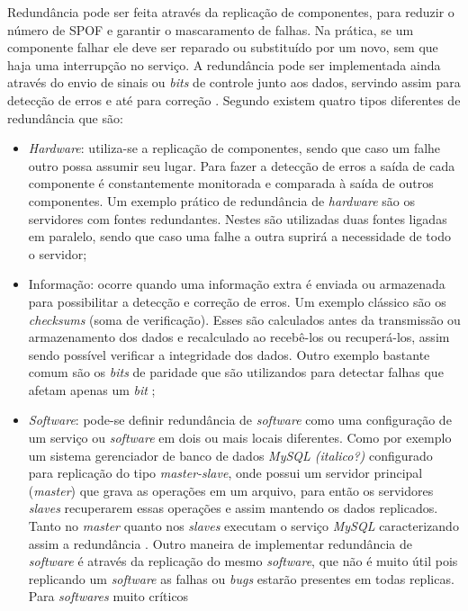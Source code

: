 Redundância pode ser feita através da replicação de componentes, para reduzir o número de \ac{SPOF} e garantir o mascaramento de falhas.
Na prática, se um componente falhar ele deve ser reparado ou substituído por um novo, sem que haja uma interrupção no serviço.
A redundância pode ser implementada ainda através do envio de sinais ou \textit{bits} de controle junto aos dados, servindo assim para 
detecção de erros e até para correção \cite{weber2002}. Segundo \cite{norvag2000} existem quatro tipos diferentes de redundância que são:
\begin{itemize}
 \item \textit{Hardware}: utiliza-se a replicação de componentes, sendo que caso um falhe outro possa assumir seu lugar. 
 Para fazer a detecção de erros a saída de cada componente é constantemente monitorada e comparada à saída de outros componentes.
 Um exemplo prático de redundância de \textit{hardware} são os servidores com fontes redundantes. Nestes são utilizadas duas fontes ligadas 
 em paralelo, sendo que caso uma falhe a outra suprirá a necessidade de todo o servidor;
 \item Informação: ocorre quando uma informação extra é enviada ou armazenada para possibilitar a detecção e correção de erros.
 Um exemplo clássico são os \textit{checksums} (soma de verificação). Esses são calculados antes da transmissão ou armazenamento dos dados 
 e recalculado ao recebê-los ou recuperá-los, assim sendo possível verificar a integridade dos dados. Outro exemplo bastante comum são os 
 \textit{bits} de paridade que são utilizandos para detectar falhas que afetam apenas um \textit{bit} \cite{weber2002};
 \item \textit{Software}: pode-se definir redundância de \textit{software} como uma configuração de um serviço ou \textit{software} em
 dois ou mais locais diferentes. Como por exemplo um sistema gerenciador de banco de dados \textit{MySQL (italico?)} configurado para
 replicação do tipo \textit{master-slave}, onde possui um servidor principal (\textit{master}) que grava as operações em um arquivo, 
 para então os servidores \textit{slaves} recuperarem essas operações e assim mantendo os dados replicados. Tanto no \textit{master} 
 quanto nos \textit{slaves} executam o serviço \textit{MySQL} caracterizando assim a redundância \cite{viana201}.
 Outro maneira de implementar redundância de \textit{software} é através da replicação do mesmo \textit{software}, que não é muito útil 
 pois replicando um \textit{software} as falhas ou \textit{bugs} estarão presentes em todas replicas. Para \textit{softwares} muito críticos

\end{itemize}
